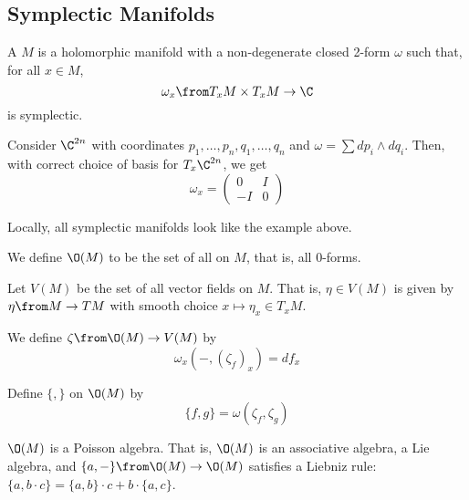 \subsection{Symplectic Manifolds}
\begin{defn}
  A  \(M\) is a holomorphic manifold with a
  non-degenerate closed 2-form \(\omega\) such that, for all \(x \in M\), \[
    \omega_x \from T_x M \times T_x M \to \C
  \]
  is symplectic.
\end{defn}
\begin{example}
  Consider \(\C^{2n}\) with coordinates \(p_1, \ldots, p_n,
  q_1, \ldots, q_n\) and \(\omega = \sum dp_i \wedge dq_i\). Then,
  with correct choice of basis for \(T_x \C^{2n}\), we get \[
    \omega_x = \left(
      \begin{array}{cc}
        0 & I \\
        -I & 0
      \end{array}
\right)
  \]
\end{example}
\begin{thm}
  Locally, all symplectic manifolds look like the example above.
\end{thm}
\begin{defn}
  We define \(\O(M)\) to be the set of all  on
  \(M\), that is, all 0-forms.
\end{defn}
\begin{defn}
  Let \(V(M)\) be the set of all vector fields on \(M\). That is,
  \(\eta \in V(M)\) is given by \(\eta \from M \to TM\) with smooth
  choice \(x \mapsto \eta_x \in T_x M\).
\end{defn}
\begin{defn}
  We define \(\zeta \from \O(M) \to V(M)\) by \[
    \omega_x(-,(\zeta_f)_x) = df_x
  \]
\end{defn}
\begin{defn}
  Define \(\{,\}\) on \(\O(M)\) by \[
    \{f,g\} = \omega(\zeta_f, \zeta_g)
  \]
\end{defn}
\begin{thm}
  \(\O(M)\) is a Poisson algebra. That is, \(\O(M)\) is an associative
  algebra, a Lie algebra, and \(\{a,-\} \from \O(M) \to \O(M)\)
  satisfies a Liebniz rule: \(\{a,b \cdot c\} = \{a,b\} \cdot c + b
  \cdot \{a,c\}\). 
\end{thm}
